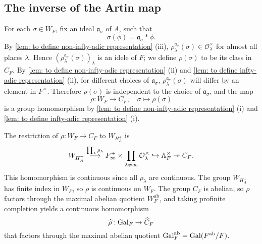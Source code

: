 \documentclass{article}
\renewcommand{\O}{\mathcal{O}}
\newcommand{\ab}{\mathrm{ab}}
\begin{document}
\subsection{The inverse of the Artin map}
For each $\sigma\in W_F$,
fix an ideal $\mathfrak{a}_\sigma$ of $A$,
such that \[\sigma(\phi) = \mathfrak{a}_\sigma * \phi.\]
By \cref{lem: to define non-infty-adic representation} (iii),
$\rho_\lambda^{\mathfrak{a}_\sigma}(\sigma)\in \O_\lambda^\times$ for almost all places $\lambda$.
Hence $\left( \rho_\lambda^{\mathfrak{a}_\sigma}(\sigma) \right)_\lambda$ is an idele of $F$;
we define $\rho(\sigma)$ to be its class in $C_F$.
By \cref{lem: to define non-infty-adic representation} (ii) and \cref{lem: to define infty-adic representation} (ii),
for different choices of $\mathfrak{a}_\sigma$,
$\rho_\lambda^{\mathfrak{a}_\sigma}(\sigma)$ will differ by an element in $F^\times$.
Therefore $\rho(\sigma)$ is independent to the choice of $\mathfrak{a}_\sigma$,
and the map \[\rho : W_F\to C_F,\quad \sigma\mapsto\rho(\sigma)\]
is a group homomorphism by \cref{lem: to define non-infty-adic representation} (i) and \cref{lem: to define infty-adic representation} (i).

The restriction of $\rho : W_F\to C_F$ to $W_{H_A^+}$ is
\[W_{H_A^+}\stackrel{\prod_{\lambda}\rho_\lambda}{\longrightarrow} F_\infty^+\times \prod_{\lambda\ne\infty} \O_\lambda^\times\hookrightarrow\A_F^\times\surject C_F.\]
This homomorphism is continuous since all $\rho_\lambda$ are continuous.
The group $W_{H_A^+}$ has finite index in $W_F$,
so $\rho$ is continuous on $W_F$.
The group $C_F$ is abelian,
so $\rho$ factors through the maximal abelian quotient $W_F^\ab$,
and taking profinite completion yields a continuous homomorphism
\[\widehat\rho : \operatorname{Gal}_F\to \widehat C_F\]
that factors through the maximal abelian quotient $\gal_F^\ab = \gal(F^\ab/F)$.
\end{document}
